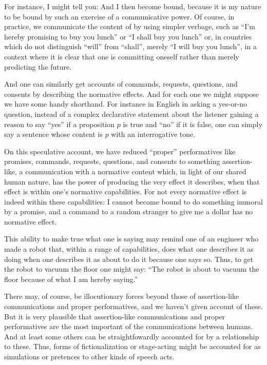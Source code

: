 For instance, I might tell you:
 And I then become bound, because it is my nature to be bound by such an exercise
of a communicative power. Of course, in practice, we communicate the content of  by using
simpler verbage, such as ``I'm hereby promising to buy you lunch'' or ``I shall buy you lunch'' or,
in countries which do not distinguish ``will'' from ``shall'', merely ``I will buy you lunch'', in a context
where it is clear that one is committing oneself rather than merely predicting the future. 

And one can similarly get accounts of commands, requests, questions, and consents by describing the normative effects.
And for each one we might suppose we have some handy shorthand. For instance in English in asking a yes-or-no question, 
instead of a complex declarative statement about the listener gaining a reason to say ``yes'' if a proposition $p$ is true
and ``no'' if it is false, one can simply say a sentence whose content is $p$ with an interrogative tone. 

On this speculative account, we have reduced ``proper'' performatives like promises, commands, requests, questions, and consents to something
assertion-like, a communication with a normative content which, in light of our shared human nature, has the
power of producing the very effect it describes, when that effect is within one's normative capabilities.
For not every normative effect is indeed within these capabilities: I cannot become bound to do something 
immoral by a promise, and a command to a random stranger to give me a dollar has no normative effect.
 
This ability to make true what one is saying may remind one of an engineer who made a robot that, within a 
range of capabilities, does what one describes it as doing when one describes it as about to do it because one says
so. Thus, to get the robot to vacuum the floor one might say: ``The robot is about to vacuum the floor because of
what I am hereby saying.''

There may, of course, be illocutionary forces beyond those of assertion-like communications and proper performatives, 
and we haven't given account of these. But it is very plausible that assertion-like communications and proper performatives are
the most important of the communications between humans. And at least some others can be straightfowardly accounted
for by a relationship to these. Thus, forms of
fictionalization or stage-acting might be accounted for as simulations or
pretences to other kinds of speech acts.

